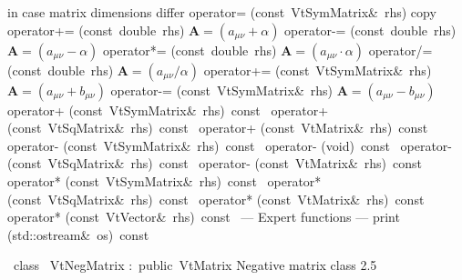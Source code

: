 \documentclass{article}
\begin{document}
\begin{cxxentry}
\begin{cxxclass}
\begin{cxxpublic}
        { in case matrix dimensions differ}
        {}
\label{cxx.2.4.15}
        {operator=}
        {(const\ VtSymMatrix\&\ rhs)}
        { copy }
        {}
\label{cxx.2.4.16}
        {operator+=}
        {(const\ double\ rhs)}
        { $\textbf{A} = (a_{\mu\nu} + \alpha)$}
        {}
\label{cxx.2.4.17}
        {operator-=}
        {(const\ double\ rhs)}
        { $\textbf{A} = (a_{\mu\nu} - \alpha)$}
        {}
\label{cxx.2.4.18}
        {operator*=}
        {(const\ double\ rhs)}
        { $\textbf{A} = (a_{\mu\nu} \cdot\alpha)$}
        {}
\label{cxx.2.4.19}
        {operator/=}
        {(const\ double\ rhs)}
        { $\textbf{A} = (a_{\mu\nu} / \alpha)$}
        {}
\label{cxx.2.4.20}
        {operator+=}
        {(const\ VtSymMatrix\&\ rhs)}
        { $\textbf{A} = (a_{\mu\nu} + b_{\mu\nu})$}
        {}
\label{cxx.2.4.21}
        {operator-=}
        {(const\ VtSymMatrix\&\ rhs)}
        { $\textbf{A} = (a_{\mu\nu} - b_{\mu\nu})$}
        {}
\label{cxx.2.4.22}
        {operator+}
        {(const\ VtSymMatrix\&\ rhs)\ const\ }
        {}
        {}
\label{cxx.2.4.23}
        {operator+}
        {(const\ VtSqMatrix\&\ rhs)\ const\ }
        {}
        {}
\label{cxx.2.4.24}
        {operator+}
        {(const\ VtMatrix\&\ rhs)\ const\ }
        {}
        {}
\label{cxx.2.4.25}
        {operator-}
        {(const\ VtSymMatrix\&\ rhs)\ const\ }
        {}
        {}
\label{cxx.2.4.26}
        {operator-}
        {(void)\ const\ }
        {}
        {}
\label{cxx.2.4.27}
        {operator-}
        {(const\ VtSqMatrix\&\ rhs)\ const\ }
        {}
        {}
\label{cxx.2.4.28}
        {operator-}
        {(const\ VtMatrix\&\ rhs)\ const\ }
        {}
        {}
\label{cxx.2.4.29}
        {operator*}
        {(const\ VtSymMatrix\&\ rhs)\ const\ }
        {}
        {}
\label{cxx.2.4.30}
        {operator*}
        {(const\ VtSqMatrix\&\ rhs)\ const\ }
        {}
        {}
\label{cxx.2.4.31}
        {operator*}
        {(const\ VtMatrix\&\ rhs)\ const\ }
        {}
        {}
\label{cxx.2.4.32}
        {operator*}
        {(const\ VtVector\&\ rhs)\ const\ }
        {}
        {}
\label{cxx.2.4.33}
\cxxitem{}
        {--- Expert functions --- }
        {}
        {}
        {}
\label{cxx.2.4.34}
        {print}
        {(std::ostream\&\ os)\ const\ }
        {}
        {}
\label{cxx.2.4.35}
\end{cxxpublic}
\end{cxxclass}
\begin{cxxclass}
{\ class\ }
        {VtNegMatrix}
        {:\ public\ VtMatrix}
        {Negative matrix class}
        {2.5}
\begin{cxxInheritance}

\end{cxxInheritance}
\end{cxxclass}
\end{cxxentry}
\end{document}
